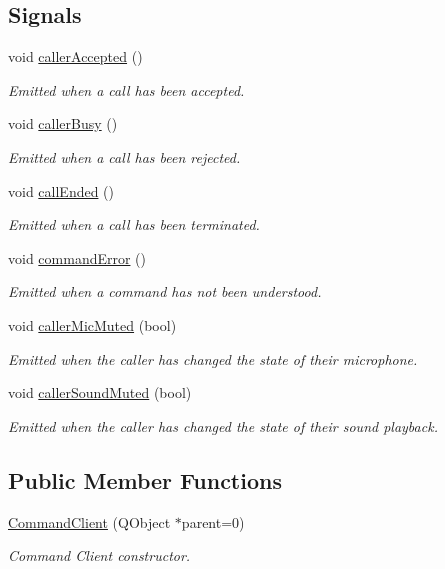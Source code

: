 \subsection*{\-Signals}
\begin{DoxyCompactItemize}
\item 
void \hyperlink{class_command_client_a51e78fcbc30e280148c3d96febd3f2f5}{caller\-Accepted} ()
\begin{DoxyCompactList}\small\item\em \-Emitted when a call has been accepted. \end{DoxyCompactList}\item 
void \hyperlink{class_command_client_ad0881250571d8d7ec7162f7ec5aca387}{caller\-Busy} ()
\begin{DoxyCompactList}\small\item\em \-Emitted when a call has been rejected. \end{DoxyCompactList}\item 
void \hyperlink{class_command_client_a191f0dce261b1edc31709f919882606b}{call\-Ended} ()
\begin{DoxyCompactList}\small\item\em \-Emitted when a call has been terminated. \end{DoxyCompactList}\item 
void \hyperlink{class_command_client_a72548d402f5213d7e49f7292a47b5194}{command\-Error} ()
\begin{DoxyCompactList}\small\item\em \-Emitted when a command has not been understood. \end{DoxyCompactList}\item 
void \hyperlink{class_command_client_a52ec0fcb2b894c2e3642779d27c4bb14}{caller\-Mic\-Muted} (bool)
\begin{DoxyCompactList}\small\item\em \-Emitted when the caller has changed the state of their microphone. \end{DoxyCompactList}\item 
void \hyperlink{class_command_client_a71bad5cfe2219924e6aaec0f2426b03d}{caller\-Sound\-Muted} (bool)
\begin{DoxyCompactList}\small\item\em \-Emitted when the caller has changed the state of their sound playback. \end{DoxyCompactList}\end{DoxyCompactItemize}
\subsection*{\-Public \-Member \-Functions}
\begin{DoxyCompactItemize}
\item 
\hyperlink{class_command_client_a14a6d40dd5e192c96b15e65ca3d668b4}{\-Command\-Client} (\-Q\-Object $\ast$parent=0)
\begin{DoxyCompactList}\small\item\em \-Command \-Client constructor. \end{DoxyCompactList}\end{DoxyCompactItemize}
